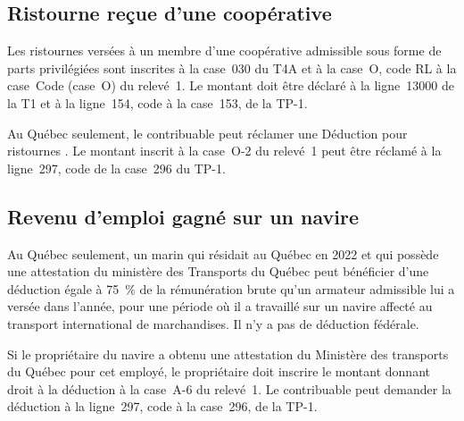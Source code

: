 \subsection{Ristourne reçue d'une coopérative}
Les ristournes versées à un membre d'une coopérative admissible sous forme de parts privilégiées sont inscrites à la case~030 du T4A et à la case~O, code \og RL \fg{} à la case~\og Code (case~O) \fg{} du relevé~1. Le montant doit être déclaré à la ligne~13000 de la T1 et à la ligne~154, code  \fg{} à la case~153, de la TP-1.

Au Québec seulement, le contribuable peut réclamer une \og Déduction pour ristournes \fg{}. Le montant inscrit à la case~O-2 du relevé~1 peut être réclamé à la ligne~297, code  \fg{} de la case~296 du TP-1.


\subsection{Revenu d'emploi gagné sur un navire}
Au Québec seulement, un marin qui résidait au Québec en 2022 et qui possède une attestation du ministère des Transports du Québec peut bénéficier d'une déduction égale à 75~\% de la rémunération brute qu'un armateur admissible lui a versée dans l'année, pour une période où il a travaillé sur un navire affecté au transport international de marchandises. Il n'y a pas de déduction fédérale.

Si le propriétaire du navire a obtenu une attestation du Ministère des transports du Québec pour cet employé, le propriétaire doit inscrire le montant donnant droit à la déduction à la case~A-6 du relevé~1. Le contribuable peut demander la déduction à la ligne~297, code  \fg{} à la case~296, de la TP-1.


